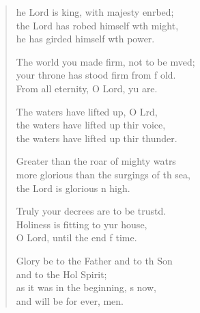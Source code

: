 \begin{verse}
  \begin{patverse}
he Lord is king, with majesty enrbed;\Flex\\
    the Lord has robed himself w\pointup{\i}th might,\Med\\
    he has girded himself w\pointup{\i}th power.

The world you made firm, not to be mved;\Flex\\
    your throne has stood firm from f old.\Med\\
    From all eternity, O Lord, yu are.

The waters have lifted up, O Lrd,\Flex\\
    the waters have lifted up thir voice,\Med\\
    the waters have lifted up thir thunder.

Greater than the roar of mighty watrs\Flex\\
    more glorious than the surgings of th sea,\Med\\
    the Lord is glorious n high.

Truly your decrees are to be trustd.\Flex\\
    Holiness is fitting to yur house,\Med\\
    O Lord, until the end f time.

Glory be to the Father and to th Son\Med\\
    and to the Hol Spirit;\\
as it was in the beginning, \pointup{\i}s now,\Med\\
    and will be for ever, men.
  \end{patverse}
\end{verse}
